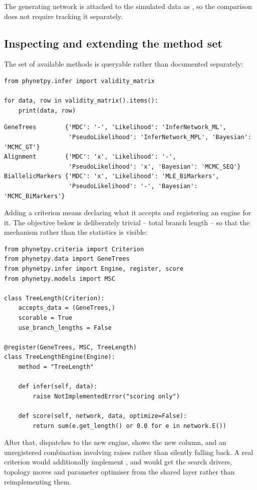 The generating network is attached to the simulated data as
, so the comparison does not require tracking it separately.

\subsection{Inspecting and extending the method set}

The set of available methods is queryable rather than documented separately:

\begin{lstlisting}
from phynetpy.infer import validity_matrix

for data, row in validity_matrix().items():
    print(data, row)
\end{lstlisting}

\begin{lstlisting}[language={}, basicstyle=\ttfamily\scriptsize]
GeneTrees        {'MDC': '-', 'Likelihood': 'InferNetwork_ML',
                  'PseudoLikelihood': 'InferNetwork_MPL', 'Bayesian': 'MCMC_GT'}
Alignment        {'MDC': 'x', 'Likelihood': '-',
                  'PseudoLikelihood': 'x', 'Bayesian': 'MCMC_SEQ'}
BiallelicMarkers {'MDC': 'x', 'Likelihood': 'MLE_BiMarkers',
                  'PseudoLikelihood': '-', 'Bayesian': 'MCMC_BiMarkers'}
\end{lstlisting}

Adding a criterion means declaring what it accepts and registering an engine for
it. The objective below is deliberately trivial -- total branch length -- so that
the mechanism rather than the statistics is visible:

\begin{lstlisting}
from phynetpy.criteria import Criterion
from phynetpy.data import GeneTrees
from phynetpy.infer import Engine, register, score
from phynetpy.models import MSC

class TreeLength(Criterion):
    accepts_data = (GeneTrees,)
    scorable = True
    use_branch_lengths = False

@register(GeneTrees, MSC, TreeLength)
class TreeLengthEngine(Engine):
    method = "TreeLength"

    def infer(self, data):
        raise NotImplementedError("scoring only")

    def score(self, network, data, optimize=False):
        return sum(e.get_length() or 0.0 for e in network.E())
\end{lstlisting}

After that,  dispatches to the new
engine,  shows the new column, and an unregistered
combination involving  raises  rather
than silently falling back. A real criterion would additionally implement
, and would get the search drivers, topology moves and parameter
optimiser from the shared layer rather than reimplementing them.
